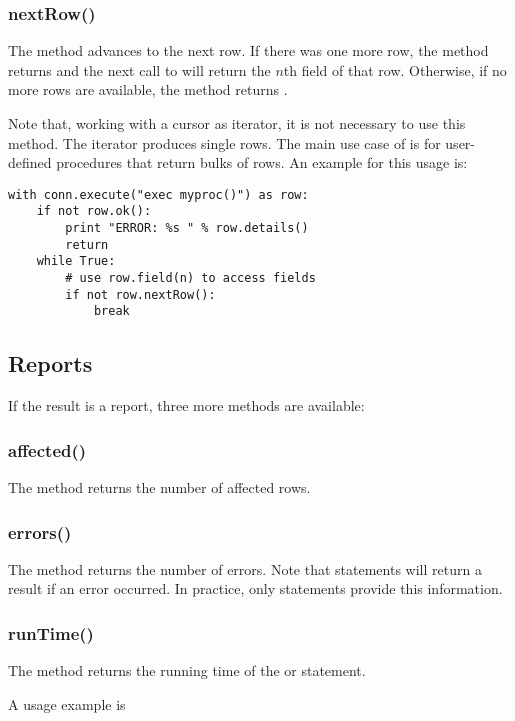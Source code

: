 \subsubsection{nextRow()}
The method advances to the next row.
If there was one more row, the method
returns  and the next call
to  will return the
$n$th field of that row.
Otherwise, if no more rows are available,
the method returns .

Note that, working with a cursor
as iterator, it is not necessary
to use this method. The iterator
produces single rows.
The main use case of 
is for user-defined procedures that
return bulks of rows. An example
for this usage is:

\begin{python}
\begin{lstlisting}
with conn.execute("exec myproc()") as row:
    if not row.ok():
        print "ERROR: %s " % row.details()
        return
    while True:
        # use row.field(n) to access fields
        if not row.nextRow():
            break
\end{lstlisting}
\end{python}

\subsection{Reports}
If the result is a report,
three more methods are available:

\subsubsection{affected()}
The method returns the number of affected rows.

\subsubsection{errors()}
The method returns the number of errors.
Note that  statements will
return a  result if an error occurred.
In practice, only  statements provide
this information.

\subsubsection{runTime()}
The method returns the running time of 
the  or  statement.

A usage example is

